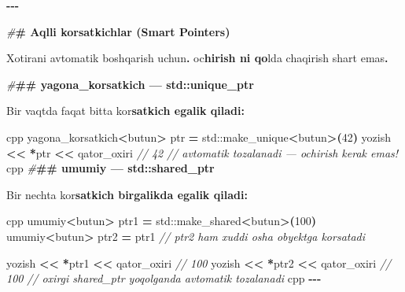 \documentclass[a4paper,11pt,twoside,openright]{book}
\newenvironment{Shaded}{\begin{snugshade}}{\end{snugshade}}
\newcommand{\BuiltInTok}[1]{#1}
\newcommand{\CharTok}[1]{\textcolor[rgb]{0.31,0.60,0.02}{#1}}
\newcommand{\CommentTok}[1]{\textcolor[rgb]{0.56,0.35,0.01}{\textit{#1}}}
\newcommand{\DecValTok}[1]{\textcolor[rgb]{0.00,0.00,0.81}{#1}}
\newcommand{\ErrorTok}[1]{\textcolor[rgb]{0.64,0.00,0.00}{\textbf{#1}}}
\newcommand{\NormalTok}[1]{#1}
\newcommand{\OperatorTok}[1]{\textcolor[rgb]{0.81,0.36,0.00}{\textbf{#1}}}
\newcommand{\PreprocessorTok}[1]{\textcolor[rgb]{0.56,0.35,0.01}{\textit{#1}}}
\begin{document}
\begin{Shaded}
\begin{Highlighting}[]
\OperatorTok{{-}{-}{-}}

\PreprocessorTok{\#}\ErrorTok{\# Aqlli ko\textquotesingle{}rsatkichlar (Smart Pointers)}

\NormalTok{Xotirani avtomatik boshqarish uchun}\OperatorTok{.} \ErrorTok{\textasciigrave{}}\NormalTok{o}\CharTok{\textquotesingle{}c}\ErrorTok{hirish\textasciigrave{} ni qo}\CharTok{\textquotesingle{}}\NormalTok{lda chaqirish shart emas}\OperatorTok{.}

\PreprocessorTok{\#}\ErrorTok{\#\# \textasciigrave{}yagona\_korsatkich\textasciigrave{} — \textasciigrave{}std::unique\_ptr\textasciigrave{}}

\NormalTok{Bir vaqtda faqat bitta ko}\CharTok{\textquotesingle{}r}\ErrorTok{satkich egalik qiladi:}

\ErrorTok{\textasciigrave{}\textasciigrave{}\textasciigrave{}}\NormalTok{cpp}
\NormalTok{yagona\_korsatkich}\OperatorTok{\textless{}}\NormalTok{butun}\OperatorTok{\textgreater{}}\NormalTok{ ptr }\OperatorTok{=} \BuiltInTok{std::}\NormalTok{make\_unique}\OperatorTok{\textless{}}\NormalTok{butun}\OperatorTok{\textgreater{}(}\DecValTok{42}\OperatorTok{)}
\NormalTok{yozish }\OperatorTok{\textless{}\textless{}} \OperatorTok{*}\NormalTok{ptr }\OperatorTok{\textless{}\textless{}}\NormalTok{ qator\_oxiri   }\CommentTok{// 42}
\CommentTok{// avtomatik tozalanadi — o\textquotesingle{}chirish kerak emas!}
\ErrorTok{\textasciigrave{}\textasciigrave{}\textasciigrave{}}\NormalTok{cpp}
\PreprocessorTok{\#}\ErrorTok{\#\# \textasciigrave{}umumiy\textasciigrave{} — \textasciigrave{}std::shared\_ptr\textasciigrave{}}

\NormalTok{Bir nechta ko}\CharTok{\textquotesingle{}r}\ErrorTok{satkich birgalikda egalik qiladi:}

\ErrorTok{\textasciigrave{}\textasciigrave{}\textasciigrave{}}\NormalTok{cpp}
\NormalTok{umumiy}\OperatorTok{\textless{}}\NormalTok{butun}\OperatorTok{\textgreater{}}\NormalTok{ ptr1 }\OperatorTok{=} \BuiltInTok{std::}\NormalTok{make\_shared}\OperatorTok{\textless{}}\NormalTok{butun}\OperatorTok{\textgreater{}(}\DecValTok{100}\OperatorTok{)}
\NormalTok{umumiy}\OperatorTok{\textless{}}\NormalTok{butun}\OperatorTok{\textgreater{}}\NormalTok{ ptr2 }\OperatorTok{=}\NormalTok{ ptr1    }\CommentTok{// ptr2 ham xuddi o\textquotesingle{}sha obyektga ko\textquotesingle{}rsatadi}

\NormalTok{yozish }\OperatorTok{\textless{}\textless{}} \OperatorTok{*}\NormalTok{ptr1 }\OperatorTok{\textless{}\textless{}}\NormalTok{ qator\_oxiri   }\CommentTok{// 100}
\NormalTok{yozish }\OperatorTok{\textless{}\textless{}} \OperatorTok{*}\NormalTok{ptr2 }\OperatorTok{\textless{}\textless{}}\NormalTok{ qator\_oxiri   }\CommentTok{// 100}
\CommentTok{// oxirgi shared\_ptr yo\textquotesingle{}qolganda avtomatik tozalanadi}
\ErrorTok{\textasciigrave{}\textasciigrave{}\textasciigrave{}}\NormalTok{cpp}
\OperatorTok{{-}{-}{-}}


\end{Highlighting}
\end{Shaded}
\end{document}
